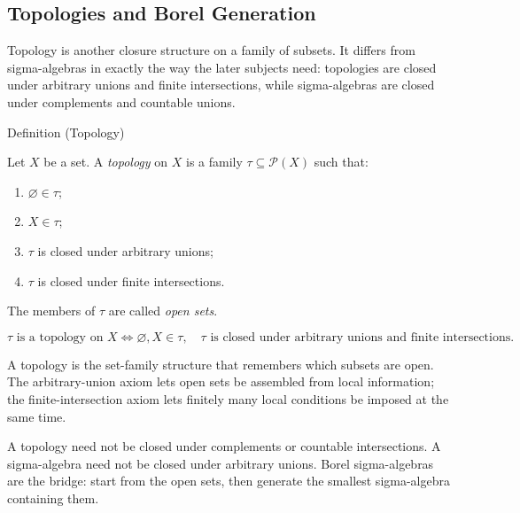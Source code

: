 
\subsection{Topologies and Borel Generation}

\begin{exposition}
Topology is another closure structure on a family of subsets.  It differs from
sigma-algebras in exactly the way the later subjects need: topologies are
closed under arbitrary unions and finite intersections, while sigma-algebras
are closed under complements and countable unions.
\end{exposition}

\begin{definitionbox}{Definition (Topology)}
\begin{definition}[Topology]\label{def:topology}
Let \(X\) be a set.  A \emph{topology} on \(X\) is a family
\(\tau\subseteq\mathcal P(X)\) such that:
\begin{enumerate}[label=(\roman*)]
\item \(\varnothing\in\tau\);
\item \(X\in\tau\);
\item \(\tau\) is closed under arbitrary unions;
\item \(\tau\) is closed under finite intersections.
\end{enumerate}
The members of \(\tau\) are called \emph{open sets}.
\end{definition}
\end{definitionbox}

\begin{remark*}
\[
\tau\text{ is a topology on }X
\iff
\varnothing,X\in\tau,\quad
\tau\text{ is closed under arbitrary unions and finite intersections}.
\]
\end{remark*}

\begin{remark*}[Interpretation]
A topology is the set-family structure that remembers which subsets are open.
The arbitrary-union axiom lets open sets be assembled from local information;
the finite-intersection axiom lets finitely many local conditions be imposed at
the same time.
\end{remark*}

\begin{remark*}[Exposition]
A topology need not be closed under complements or countable intersections.
A sigma-algebra need not be closed under arbitrary unions.  Borel
sigma-algebras are the bridge: start from the open sets, then generate the
smallest sigma-algebra containing them.
\end{remark*}

